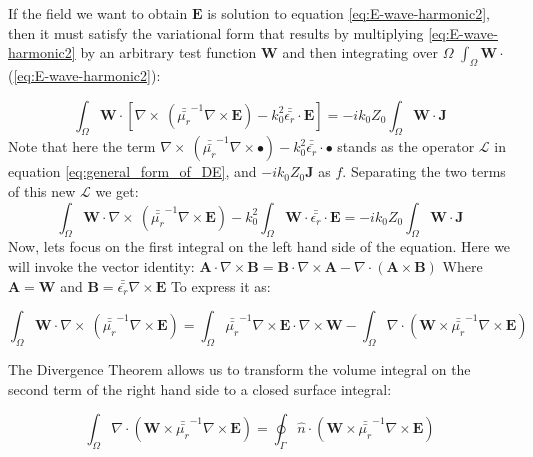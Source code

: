 If the field we want to obtain $\mathbf{E}$ is solution to equation \ref{eq:E-wave-harmonic2}, then it must satisfy the variational form that results by multiplying \ref{eq:E-wave-harmonic2} by an arbitrary test function $\mathbf{W}$ and then integrating over $\Omega$ $\int_{\Omega} \mathbf{W} \cdot$(\ref{eq:E-wave-harmonic2}):

\begin{equation}
\int_{\Omega}\mathbf{W}\cdot\left[ \nabla\times\ \left(\bar{\bar{\mu_r}}^{-1}\nabla\times \mathbf{E} \right) - k_0^{2}\bar{\bar{\epsilon_r}}\cdot \mathbf{E}\right]= - ik_0Z_0 \int_{\Omega} \mathbf{W}\cdot\mathbf{J} \label{eq:E-wave-harmonic3} 
\end{equation}
Note that here the term $\nabla\times\ \left(\bar{\bar{\mu_r}}^{-1}\nabla\times \bullet \right) - k_0^{2}\bar{\bar{\epsilon_r}}\cdot \bullet$ stands as the operator $\mathcal{L}$ in equation \ref{eq:general_form_of_DE}, and $- ik_0Z_0\mathbf{J}$ as $f$. Separating the two terms of this new $\mathcal{L}$ we get:
\begin{equation}
\int_{\Omega}\mathbf{W}\cdot \nabla\times\ \left(\bar{\bar{\mu_r}}^{-1}\nabla\times \mathbf{E} \right) -k_0^{2}\int_{\Omega}\mathbf{W}\cdot \bar{\bar{\epsilon_r}}\cdot \mathbf{E}= - ik_0Z_0 \int_{\Omega} \mathbf{W}\cdot\mathbf{J} \label{eq:E-wave-harmonic3} 
\end{equation}
Now, lets focus on the first integral on the left hand side of the equation. Here we will invoke the vector identity: $\mathbf{A}\cdot\nabla\times\mathbf{B} = \mathbf{B}\cdot\nabla\times\mathbf{A} - \nabla\cdot(\mathbf{A}\times\mathbf{B})$ 
Where $\mathbf{A}=\mathbf{W}$ and $\mathbf{B}=\bar{\bar{\epsilon_r}}\nabla\times \mathbf{E}$ To express it as:

\begin{equation}
\int_{\Omega}\mathbf{W}\cdot \nabla\times\ \left(\bar{\bar{\mu_r}}^{-1}\nabla\times \mathbf{E} \right) = \int_{\Omega} \bar{\bar{\mu_r}}^{-1}\nabla\times \mathbf{E}\cdot \nabla\times\mathbf{W}-\int_{\Omega}\nabla\cdot
\left(\mathbf{W}\times\bar{\bar{\mu_r}}^{-1}\nabla\times\mathbf{E}
\right) 
\end{equation}

The Divergence Theorem allows us to transform the volume integral on the second term of the right hand side to a closed surface integral:

\begin{equation}
\int_{\Omega}\nabla\cdot
\left(\mathbf{W}\times\bar{\bar{\mu_r}}^{-1}\nabla\times\mathbf{E}
\right) = \oint_{\Gamma}\hat{n}\cdot
\left(\mathbf{W}\times\bar{\bar{\mu_r}}^{-1}\nabla\times\mathbf{E}
\right) 
\end{equation}

